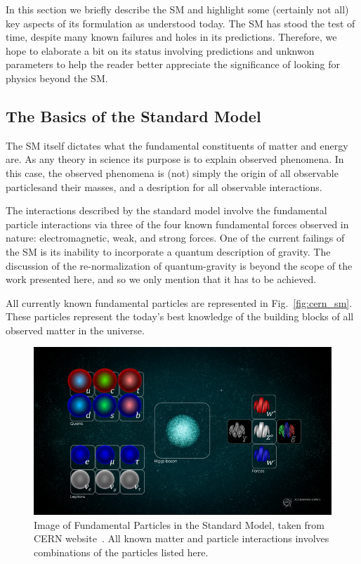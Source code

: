 In this section we briefly describe the SM and highlight some (certainly not all) key aspects of its formulation as understood today.
The SM has stood the test of time, despite many known failures and holes in its predictions.
Therefore, we hope to elaborate a bit on its status involving predictions and unknwon parameters to help the reader better appreciate the significance of looking for physics beyond the SM.

\subsection{The Basics of the Standard Model}

The SM itself dictates what the fundamental constituents of matter and energy are.
As any theory in science its purpose is to explain observed phenomena.
In this case, the observed phenomena is (not) simply the origin of all observable particlesand their masses, and a desription for all observable interactions.

The interactions described by the standard model involve the fundamental particle interactions via three of the four known fundamental forces observed in nature: electromagnetic, weak, and strong forces.
One of the current failings of the SM is its inability to incorporate a quantum description of gravity.
The discussion of the re-normalization of quantum-gravity is beyond the scope of the work presented here, and so we only mention that it has to be achieved.

All currently known fundamental particles are represented in Fig.~\ref{fig:cern_sm}.
These particles represent the today's best knowledge of the building blocks of all observed matter in the universe.

\begin{figure}[]
\centering
\includegraphics[width=\textwidth]{images/STDM_higgs_and_field_D.png}
\caption{Image of Fundamental Particles in the Standard Model, taken from CERN website~\citep{dominguez_2015}. All known matter and particle interactions involves combinations of the particles listed here.}
\end{figure}
~\label{fig:cern_sm}

